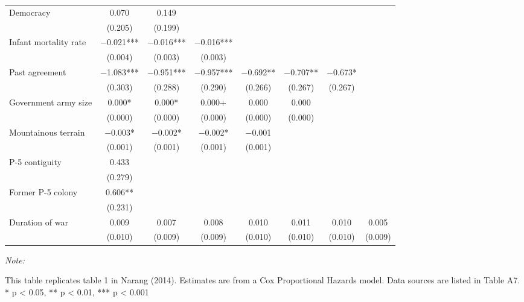 \begin{table}
\begin{threeparttable}
\begin{tabular}[t]{lccccccc}
Democracy & \num{0.070} & \num{0.149} &  &  &  &  & \\
 & (\num{0.205}) & (\num{0.199}) &  &  &  &  & \\
Infant mortality rate & \num{-0.021}*** & \num{-0.016}*** & \num{-0.016}*** &  &  &  & \\
 & (\num{0.004}) & (\num{0.003}) & (\num{0.003}) &  &  &  & \\
Past agreement & \num{-1.083}*** & \num{-0.951}*** & \num{-0.957}*** & \num{-0.692}** & \num{-0.707}** & \num{-0.673}* & \\
 & (\num{0.303}) & (\num{0.288}) & (\num{0.290}) & (\num{0.266}) & (\num{0.267}) & (\num{0.267}) & \\
Government army size & \num{0.000}* & \num{0.000}* & \num{0.000}+ & \num{0.000} & \num{0.000} &  & \\
 & (\num{0.000}) & (\num{0.000}) & (\num{0.000}) & (\num{0.000}) & (\num{0.000}) &  & \\
Mountainous terrain & \num{-0.003}* & \num{-0.002}* & \num{-0.002}* & \num{-0.001} &  &  & \\
 & (\num{0.001}) & (\num{0.001}) & (\num{0.001}) & (\num{0.001}) &  &  & \\
P-5 contiguity & \num{0.433} &  &  &  &  &  & \\
 & (\num{0.279}) &  &  &  &  &  & \\
Former P-5 colony & \num{0.606}** &  &  &  &  &  & \\
 & (\num{0.231}) &  &  &  &  &  & \\
Duration of war & \num{0.009} & \num{0.007} & \num{0.008} & \num{0.010} & \num{0.011} & \num{0.010} & \num{0.005}\\
 & (\num{0.010}) & (\num{0.009}) & (\num{0.009}) & (\num{0.010}) & (\num{0.010}) & (\num{0.010}) & (\num{0.009})\\
\bottomrule
\end{tabular}
\begin{tablenotes}[para]
\item \textit{Note: } 
\item This table replicates table 1 in Narang (2014). Estimates are from a Cox Proportional Hazards model. Data sources are listed in Table A7. * p < 0.05, ** p < 0.01, *** p < 0.001
\end{tablenotes}
\end{threeparttable}
\end{table}
